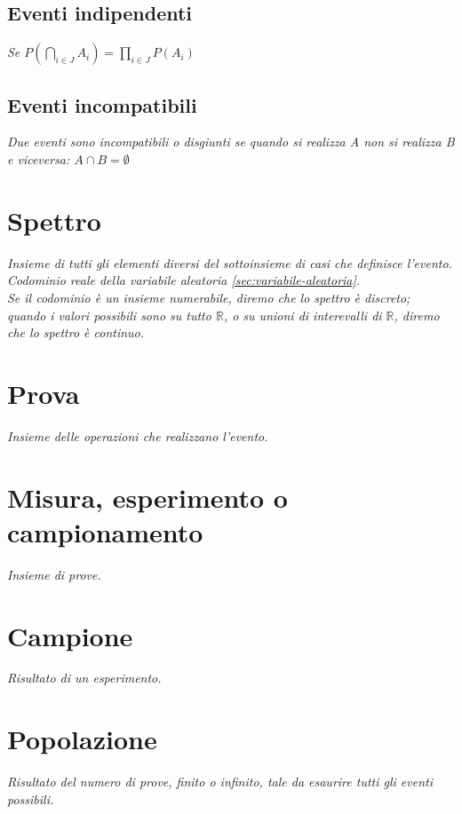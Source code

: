 \subsection{Eventi indipendenti} %
\label{subsec:indipendenti}
\emph{Se $P(\bigcap _{ i\in J }{ { A }_{ i } } )=\prod _{ i\in J }{ P({ A }_{ i }) } $}
\subsection{Eventi incompatibili} %
\label{subsec:incompatibili}
\emph{Due eventi sono incompatibili o disgiunti se quando si realizza A non si realizza B e viceversa: $A\cap B=\emptyset$}

\section{Spettro} %
\label{sec:spettro}
\emph{Insieme di tutti gli elementi diversi del sottoinsieme di casi che definisce l'evento. Codominio reale della variabile aleatoria \ref{sec:variabile-aleatoria}. \\ Se il codominio è un insieme numerabile, diremo che lo spettro è discreto; \\ quando i valori possibili sono su tutto $\mathbb{R}$, o su unioni di interevalli di $\mathbb{R}$, diremo che lo spettro è continuo.}

\section{Prova} %
\label{sec:prova}
\emph{Insieme delle operazioni che realizzano l'evento.}

\section{Misura, esperimento o campionamento} %
\label{sece:misura}
\emph{Insieme di prove.}

\section{Campione} %
\label{sec:campione}
\emph{Risultato di un esperimento.}

\section{Popolazione} %
\label{sec:popolazione}
\emph{Risultato del numero di prove, finito o infinito, tale da esaurire tutti gli eventi possibili.}

